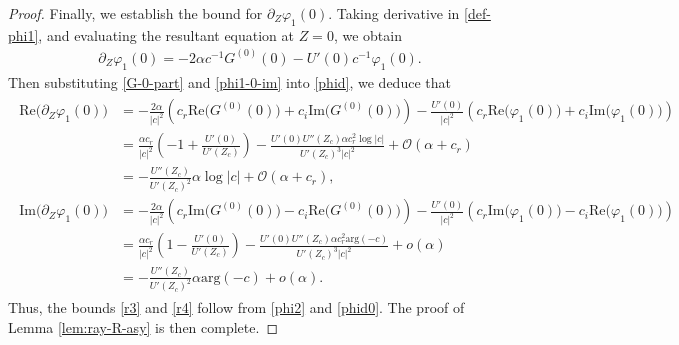 \documentclass[10pt,a4paper]{amsart}
\begin{document}
\begin{proof}
	Finally, we establish the bound for $\partial_Z\varphi_1(0)$. Taking derivative in \eqref{def-phi1}, and evaluating the resultant equation at $Z=0$, we obtain
\begin{align}
	\partial_Z\varphi_1(0)=-2\alpha c^{-1}G^{(0)}(0)-U'(0)c^{-1}\varphi_1(0).\label{phid}
\end{align}
Then substituting \eqref{G-0-part} and \eqref{phi1-0-im} into \eqref{phid}, we deduce that
\begin{align}
	\begin{aligned}
		\text{Re}\big(\partial_Z\varphi_1(0)\big)&=-\frac{2\alpha}{|c|^2}\left(
		c_r\text{Re}\big(G^{(0)}(0)\big)+c_i\text{Im}\big(G^{(0)}(0)\big)
		\right)-\frac{U'(0)}{|c|^2}\left(
		c_r\text{Re}\big(\varphi_1(0)\big)+c_i\text{Im}\big(\varphi_1(0)\big)
		\right)\\
		&=\frac{\alpha c_r}{|c|^2}\left(-1+\frac{U'(0)}{U'(Z_c)}\right)-\frac{U'(0)U''(Z_c)\alpha c_r^2\log|c|}{U'(Z_c)^3|c|^2}+\mathcal{O}(\alpha+c_r)\\
		&=-\frac{U''(Z_c)}{U'(Z_c)^2}\alpha \log|c|+\mathcal{O}(\alpha+c_r),\\
		\text{Im}\big(\partial_Z\varphi_1(0)\big)&=-\frac{2\alpha}{|c|^2}\left(
		c_r\text{Im}\big(G^{(0)}(0)\big)-c_i\text{Re}\big(G^{(0)}(0)\big)
		\right)-\frac{U'(0)}{|c|^2}\left(
		c_r\text{Im}\big(\varphi_1(0)\big)-c_i\text{Re}\big(\varphi_1(0)\big)
		\right)\\
		&=\frac{\alpha c_r}{|c|^2}\left(1-\frac{U'(0)}{U'(Z_c)}\right)-\frac{U'(0)U''(Z_c)\alpha c_r^2\text{arg}(-c)}{U'(Z_c)^3|c|^2}+o(\alpha)\\
		&=-\frac{U''(Z_c)}{U'(Z_c)^2}\alpha \text{arg}(-c)+o(\alpha).\label{phid0}
	\end{aligned}
\end{align}
Thus, the bounds \eqref{r3} and \eqref{r4} follow from \eqref{phi2} and \eqref{phid0}. The proof of Lemma \ref{lem:ray-R-asy} is then complete.
	\end{proof}
\end{document}
